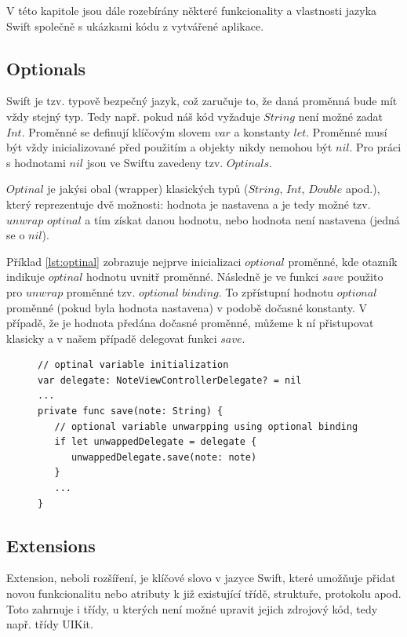 \documentclass[thesis=M,czech]{FITthesis}[2012/06/26]
\begin{document}
V této kapitole jsou dále rozebírány některé funkcionality a vlastnosti jazyka Swift společně s ukázkami kódu z vytvářené aplikace.

\subsection{Optionals}
Swift je tzv. typově bezpečný jazyk, což zaručuje to, že daná proměnná bude mít vždy stejný typ. Tedy např. pokud náš kód vyžaduje $String$ není možné zadat $Int$. 
Proměnné se definují klíčovým slovem $var$ a konstanty $let$. Proměnné musí být vždy inicializované před použitím a objekty nikdy nemohou být $nil$. Pro práci s hodnotami $nil$ jsou ve Swiftu zavedeny tzv. $Optinals$.

$Optinal$ je jakýsi obal (wrapper) klasických typů ($String$, $Int$, $Double$ apod.), který reprezentuje dvě možnosti: hodnota je nastavena a je tedy možné tzv. $unwrap$ $optinal$ a tím získat danou hodnotu, nebo hodnota není nastavena (jedná se o $nil$). \cite{devBasics}

Příklad \ref{lst:optinal} zobrazuje nejprve inicializaci $optional$ proměnné, kde otazník indikuje $optinal$ hodnotu uvnitř proměnné. Následně je ve funkci $save$ použito pro $unwrap$ proměnné tzv. $optional$ $binding$. To zpřístupní hodnotu $optional$ proměnné (pokud byla hodnota nastavena) v podobě dočasné konstanty. V případě, že je hodnota předána dočasné proměnné, můžeme k ní přistupovat klasicky a v našem případě delegovat funkci $save$.

\begin{figure}
\begin{minipage}{\linewidth}
\begin{lstlisting}[caption={Příklad práce s Optinal},label={lst:optinal}]
// optinal variable initialization
var delegate: NoteViewControllerDelegate? = nil
...
private func save(note: String) {
   // optional variable unwarpping using optional binding
   if let unwappedDelegate = delegate {
      unwappedDelegate.save(note: note)
   }
   ...
}

\end{lstlisting}
\end{minipage}
\end{figure}


\subsection{Extensions}
Extension, neboli rozšíření, je klíčové slovo v jazyce Swift, které umožňuje přidat novou funkcionalitu nebo atributy k již existující třídě, struktuře, protokolu apod. Toto zahrnuje i třídy, u kterých není možné upravit jejich zdrojový kód, tedy např. třídy UIKit.
\end{document}
